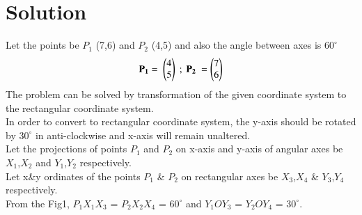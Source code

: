 \documentclass[journal,12pt,twocolumn]{IEEEtran}
\begin{document}
\section{Solution}
Let the points be $P_1$ (7,6) and $P_2$ (4,5) and also the angle between axes is $60^{\circ}$
\begin{align}
\mathbf{P_1} = \ \begin{pmatrix}4 \\5\end{pmatrix} \ ; \ \mathbf{P_2} \ = \begin{pmatrix}7\\ 6\end{pmatrix}
\end{align}
The problem can be solved by transformation of the given coordinate system to the rectangular coordinate system.\\
In order to convert to rectangular coordinate system, the y-axis should be rotated by $30^{\circ}$ in anti-clockwise and x-axis will remain unaltered.\\
Let the projections of points $P_1$ and $P_2$ on x-axis and y-axis of angular axes be $X_1$,$X_2$ and $Y_1$,$Y_2$ respectively.\\
Let x\&y ordinates of the points $P_1$ \& $P_2$ on rectangular axes be $X_3$,$X_4$ \& $Y_3$,$Y_4$ respectively.\\
From the Fig1, \angle$P_1$$X_1$$X_3$ = \angle$P_2$$X_2$$X_4$ = $60^{\circ}$ and \angle$Y_1$$O$$Y_3$ = \angle$Y_2$$O$$Y_4$ = $30^{\circ}$.\\
\end{document}
